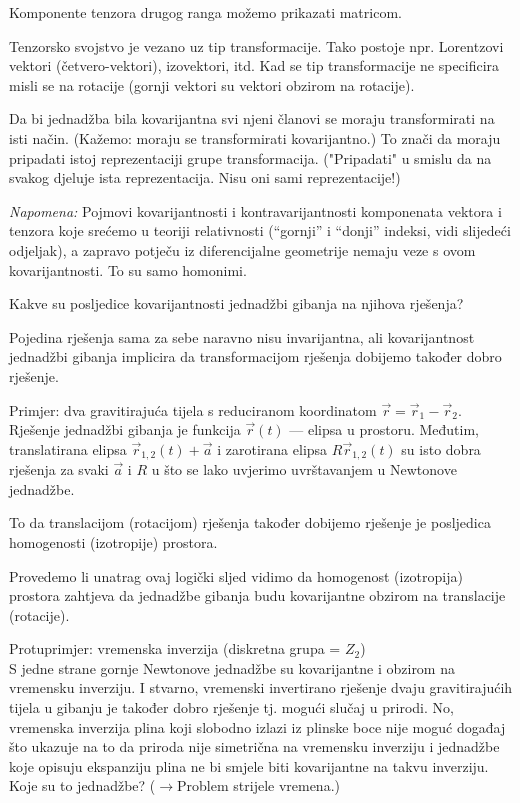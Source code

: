  Komponente tenzora drugog ranga možemo prikazati matricom.

 Tenzorsko svojstvo je vezano uz tip transformacije. Tako postoje
npr. Lorentzovi vektori (četvero-vektori), izovektori, itd.  Kad se tip
transformacije ne specificira misli se na rotacije (gornji
vektori su vektori obzirom na rotacije). 

 Da bi jednadžba bila kovarijantna svi njeni članovi se moraju transformirati
na isti način. (Kažemo: moraju se transformirati kovarijantno.)
To znači da moraju pripadati istoj reprezentaciji grupe transformacija.
("Pripadati" u smislu da na svakog djeluje ista reprezentacija. Nisu oni
sami reprezentacije!)


\emph{Napomena:}  Pojmovi kovarijantnosti i kontravarijantnosti
komponenata vektora i tenzora koje srećemo u teoriji relativnosti
(``gornji'' i ``donji'' indeksi, vidi slijedeći odjeljak), a 
zapravo potječu iz diferencijalne 
geometrije nemaju veze s ovom kovarijantnosti.  To su samo homonimi.
 
 Kakve su posljedice kovarijantnosti jednadžbi gibanja na njihova
rješenja?

  Pojedina rješenja sama za sebe naravno nisu invarijantna, ali 
kovarijantnost jednadžbi gibanja implicira da transformacijom rješenja
dobijemo također dobro rješenje.

Primjer: dva gravitirajuća tijela s reduciranom koordinatom $\vec{r}
= \vec{r}_1 - \vec{r}_2$. 
Rješenje jednadžbi gibanja je funkcija $\vec{r}(t)$ --- elipsa u prostoru.
Međutim, translatirana elipsa $\vec{r}_{1,2}(t)+\vec{a}$ i zarotirana
elipsa $R\vec{r}_{1,2}(t)$ su isto dobra rješenja za svaki $\vec{a}$ i $R$
u što se lako uvjerimo uvrštavanjem u Newtonove jednadžbe.

To da translacijom (rotacijom) rješenja također dobijemo rješenje je posljedica
homogenosti (izotropije) prostora.

Provedemo li unatrag ovaj logički sljed vidimo da homogenost
(izotropija) prostora zahtjeva da jednadžbe gibanja budu kovarijantne
obzirom na translacije (rotacije).


Protuprimjer: vremenska inverzija (diskretna grupa = $Z_2$) \\
  S jedne strane gornje Newtonove jednadžbe su kovarijantne i obzirom na vremensku
inverziju. I stvarno, vremenski invertirano rješenje dvaju gravitirajućih
tijela u gibanju je također dobro rješenje tj. mogući slučaj u prirodi.
No, vremenska inverzija plina koji slobodno izlazi iz plinske boce nije
moguć događaj što ukazuje na to da priroda nije simetrična na vremensku inverziju i
jednadžbe koje opisuju ekspanziju plina ne bi smjele biti kovarijantne
na takvu inverziju. Koje su to jednadžbe? ($\to$Problem strijele vremena.)


